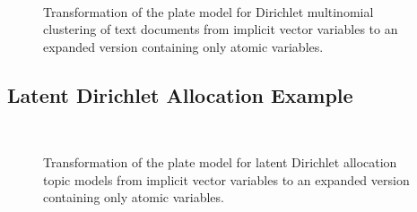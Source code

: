 \begin{figure}[t]
\begin{minipage}[t]{0.49\linewidth}
	\begin{center}
	\end{center}
\end{minipage}
\hspace{0.0cm}
\begin{minipage}[t]{0.49\linewidth}
	\begin{center}
	\end{center}
\end{minipage}\\
\caption{Transformation of the plate model for Dirichlet multinomial clustering of text documents from implicit vector variables to an expanded version containing only atomic variables.}
\label{img:clustering_platemodels}
\end{figure}

\subsection{Latent Dirichlet Allocation Example}

\begin{figure}[t]
\begin{minipage}[t]{0.49\linewidth}
	\begin{center}
	\end{center}
\end{minipage}
\hspace{0.0cm}
\begin{minipage}[t]{0.49\linewidth}
	\begin{center}
	\end{center}
\end{minipage}\\
\caption{Transformation of the plate model for latent Dirichlet allocation topic models from implicit vector variables to an expanded version containing only atomic variables.}
\label{img:topic_platemodels}
\end{figure}
